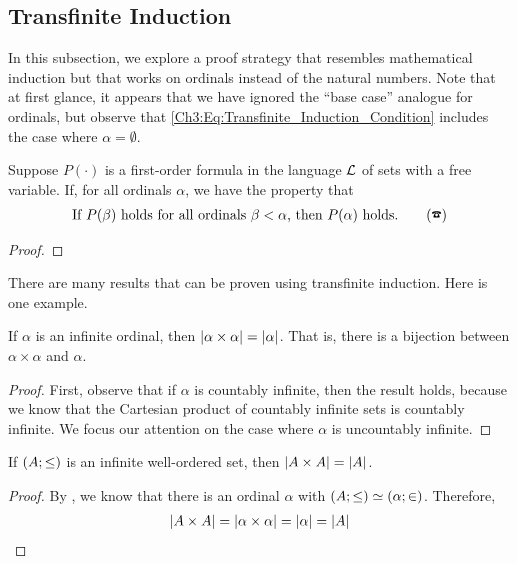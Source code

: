 \sorry

\subsection{Transfinite Induction}

In this subsection, we explore a proof strategy that resembles mathematical induction but that works on ordinals instead of the natural numbers. Note that at first glance, it appears that we have ignored the ``base case'' analogue for ordinals, but observe that \eqref{Ch3:Eq:Transfinite_Induction_Condition} includes the case where $\alpha = \emptyset$.

\begin{boxtheorem}\label{Ch3:Thm:Transfinite_Induction}
    Suppose $P(\cdot)$ is a first-order formula in the language $\mathcal{L}$ of sets with a free variable. If, for all ordinals $\alpha$, we have the property that
    \begin{align}
        \text{If } P(\beta) \text{ holds for all ordinals } \beta < \alpha \text{, then } P(\alpha) \text{ holds.}
        \label{Ch3:Eq:Transfinite_Induction_Condition}
        \tag{\ding{37}}
    \end{align}
\end{boxtheorem}
\begin{proof}
    \sorry
\end{proof}

There are many results that can be proven using transfinite induction. Here is one example.

\begin{boxtheorem}
    If $\alpha$ is an infinite ordinal, then $\left\lvert \alpha \times \alpha \right\rvert = \left\lvert \alpha \right\rvert$. That is, there is a bijection between $\alpha \times \alpha$ and $\alpha$.
\end{boxtheorem}
\begin{proof}
    First, observe that if $\alpha$ is countably infinite, then the result holds, because we know that the Cartesian product of countably infinite sets is countably infinite. We focus our attention on the case where $\alpha$ is uncountably infinite.

    \sorry
\end{proof}

\begin{boxcorollary}
    If $\left( A; \le \right)$ is an infinite well-ordered set, then $\left\lvert A \times A \right\rvert = \left\lvert A \right\rvert$.
\end{boxcorollary}
\begin{proof}
    By \sorry, we know that there is an ordinal $\alpha$ with $\left( A; \le \right) \simeq \left( \alpha; \in \right)$. Therefore,
    \begin{align*}
        \left\lvert A \times A \right\rvert = \left\lvert \alpha \times \alpha \right\rvert = \left\lvert \alpha \right\rvert = \left\lvert A \right\rvert
    \end{align*}
\end{proof}

